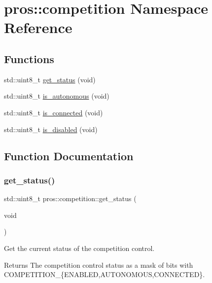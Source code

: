 \hypertarget{namespacepros_1_1competition}{}\section{pros\+:\+:competition Namespace Reference}
\label{namespacepros_1_1competition}
\subsection*{Functions}
\begin{DoxyCompactItemize}
\item 
std\+::uint8\+\_\+t \hyperlink{namespacepros_1_1competition_ad75e0e06e0817959c08798358eaa8ab0}{get\+\_\+status} (void)
\item 
std\+::uint8\+\_\+t \hyperlink{namespacepros_1_1competition_a88353a4f8e5e283558ee6504c54283af}{is\+\_\+autonomous} (void)
\item 
std\+::uint8\+\_\+t \hyperlink{namespacepros_1_1competition_aaf36367a2369390657f6bc4285f68c64}{is\+\_\+connected} (void)
\item 
std\+::uint8\+\_\+t \hyperlink{namespacepros_1_1competition_a2d4f4555af4c45f7f82ea75e1223899b}{is\+\_\+disabled} (void)
\end{DoxyCompactItemize}


\subsection{Function Documentation}
\mbox{\label{namespacepros_1_1competition_ad75e0e06e0817959c08798358eaa8ab0}} 
\subsubsection{\texorpdfstring{get\+\_\+status()}{get\_status()}}
{\footnotesize\ttfamily std\+::uint8\+\_\+t pros\+::competition\+::get\+\_\+status (\begin{DoxyParamCaption}\item[{void}]{ }\end{DoxyParamCaption})}

Get the current status of the competition control.

\begin{DoxyReturn}{Returns}
The competition control status as a mask of bits with C\+O\+M\+P\+E\+T\+I\+T\+I\+O\+N\+\_\+\{E\+N\+A\+B\+L\+ED,A\+U\+T\+O\+N\+O\+M\+O\+US,C\+O\+N\+N\+E\+C\+T\+ED\}. 
\end{DoxyReturn}
\mbox{\label{namespacepros_1_1competition_a88353a4f8e5e283558ee6504c54283af}} 

